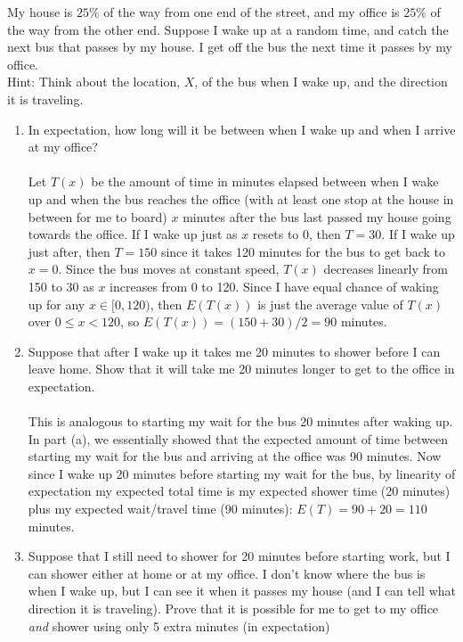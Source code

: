 \documentclass[11pt,fleqn]{article}
\begin{document}
\begin{enumerate}
My house is $25\%$ of the way from one end of the street,
and my office is $25\%$ of the way from the other end.
Suppose I wake up at a random time, and catch the next bus
that passes by my house.
I get off the bus the next time it passes by my office.\\
Hint: Think about the location, $X$, of the bus when I wake up,
and the direction it is traveling.
\begin{enumerate}
\item
In expectation, how long will it be between when
I wake up and when I arrive at my office? \\\\
Let $T(x)$ be the amount of time in minutes elapsed between when I wake up and when the bus reaches the office (with at least one stop at the house in between for me to board) $x$ minutes after the bus last passed my house going towards the office. If I wake up just as $x$ resets to $0$, then $T=30$. If I wake up just after, then $T=150$ since it takes 120 minutes for the bus to get back to $x=0$. Since the bus moves at constant speed, $T(x)$ decreases linearly from 150 to 30 as $x$ increases from 0 to 120. Since I have equal chance of waking up for any $x \in [0,120)$, then $E(T(x))$ is just the average value of $T(x)$ over $0 \leq x < 120$, so $E(T(x)) = (150+30)/2 = 90$ minutes. \\
\item
Suppose that after I wake up it takes me 20 minutes to shower
before I can leave home.
Show that it will take me 20 minutes longer to get to the office
in expectation. \\\\
This is analogous to starting my wait for the bus 20 minutes after waking up. In part (a), we essentially showed that the expected amount of time between starting my wait for the bus and arriving at the office was 90 minutes. Now since I wake up 20 minutes before starting my wait for the bus, by linearity of expectation my expected total time is my expected shower time (20 minutes) plus my expected wait/travel time (90 minutes): $E(T) = 90+20 = 110$ minutes. \\
\item 
Suppose that I still need to shower for 20 minutes before starting work,
but I can shower either at home or at my office.
I don't know where the bus is when I wake up,
but I can see it when it passes my house (and I can tell what direction
it is traveling).
Prove that it is possible for me to get to my office \emph{and}
shower using only 5 extra minutes (in expectation)

\end{enumerate}
\end{enumerate}
\end{document}
